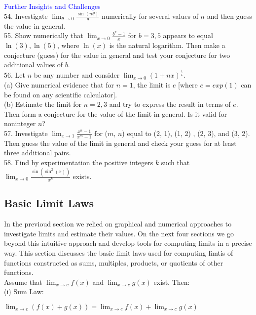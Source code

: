 \documentclass{article}
\begin{document}
\textcolor{blue}{Further Insights and Challenges}\\
54. Investigate $\lim_{\theta \to 0}\frac{\sin(n\theta)}{\theta}$ numerically for several values of $n$ and then guess the value in general.\\

55. Show numerically that $\lim_{x \to 0}\frac{b^x - 1}{x}$ for $b = 3, 5$ appears to equal $\ln(3), \ln(5)$, where $\ln(x)$ is the natural logarithm. Then make a conjecture (guess) for the value in general and test your conjecture for two additional values of $b$.\\

56. Let $n$ be any number and consider $\lim_{x \to 0}(1 + nx)^{\frac{1}{x}}$.\\
(a) Give numerical evidence that for $n = 1$, the limit is $e$ [where $e = exp(1)$ can be found on any scientific calculator].\\
(b) Estimate the limit for $n = 2, 3$ and try to express the result in terms of $e$. Then form a conjecture for the value of the limit in general. Is it valid for noninteger $n$?\\

57. Investigate $\lim_{x \to 1}\frac{x^n - 1}{x^m - 1}$ for ($m$, $n$) equal to (2, 1), (1, 2) , (2, 3),  and (3, 2). Then guess the value of the limit in general and check your guess for at least three additional pairs.\\

58. Find by experimentation the positive integers $k$ such that $\lim_{x \to 0}\frac{\sin(\sin^2(x))}{x^k}$ exists.\\

\subsection*{Basic Limit Laws}

In the previoud section we relied on graphical and numerical approaches to investigate limits and estimate their values. On the next four sections we go beyond this intuitive approach and develop tools for computing limits in a precise way. This section discusses the basic limit laws used for computing limtis of functions constructed as sums, multiples, products, or quotients of other functions.\\

Assume that $\lim_{x \to c}f(x)$ and $\lim_{x \to c}g(x)$ exist. Then:\\

(i) Sum Law:
\begin{center}$\lim_{x \to c}(f(x) + g(x)) = \lim_{x \to c}f(x) + \lim_{x \to c}g(x)$\end{center}
\end{document}
